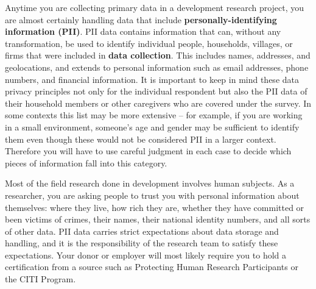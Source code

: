 Anytime you are collecting primary data in a development research project,
you are almost certainly handling data that include \textbf{personally-identifying information (PII)}.
PII data contains information that can, without any transformation, be used to identify
individual people, households, villages, or firms that were included in \textbf{data collection}.
This includes names, addresses, and geolocations, and extends to personal information
such as email addresses, phone numbers, and financial information.
It is important to keep in mind these data privacy principles not only for the individual respondent but also the PII data of their household members or other caregivers who are covered under the survey.
In some contexts this list may be more extensive --
for example, if you are working in a small environment,
someone's age and gender may be sufficient to identify them
even though these would not be considered PII in a larger context.
Therefore you will have to use careful judgment in each case
to decide which pieces of information fall into this category.

Most of the field research done in development involves human subjects.
As a researcher, you are asking people to trust you with personal information about themselves:
where they live, how rich they are, whether they have committed or been victims of crimes,
their names, their national identity numbers, and all sorts of other data.
PII data carries strict expectations about data storage and handling,
and it is the responsibility of the research team to satisfy these expectations.
Your donor or employer will most likely require you to hold a certification from a source
such as Protecting Human Research Participants
or the CITI Program.

